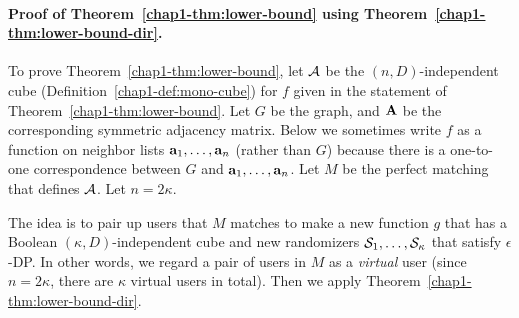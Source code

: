 {\paragraph{Proof of Theorem~\ref{chap1-thm:lower-bound} using Theorem~\ref{chap1-thm:lower-bound-dir}.}
To prove Theorem~\ref{chap1-thm:lower-bound}, let $\mathcal{A}$ be the $(n,D)$-independent 
cube (Definition~\ref{chap1-def:mono-cube}) for $f$ given in the statement of
Theorem~\ref{chap1-thm:lower-bound}. Let $G$ be the graph, 
and 
$\mathbf{A}$ be the corresponding symmetric adjacency matrix. 
Below we sometimes write $f$ as a function on neighbor lists $\mathbf{a}_1, \ldots, \mathbf{a}_n$ (rather than $G$) because there is a one-to-one correspondence between $G$ and $\mathbf{a}_1, \ldots, \mathbf{a}_n$.
Let $M$ be the perfect
matching that defines $\mathcal{A}$. Let $n=2\kappa$.

The idea is to pair up users that $M$ matches to make a new function $g$ that has a Boolean $(\kappa,D)$-independent cube and new randomizers $\mathcal{S}_1, \ldots, \mathcal{S}_\kappa$ that
satisfy $\epsilon$-DP. 
In other words, we regard a pair of users in $M$ as a \textit{virtual} user (since $n=2\kappa$, there are $\kappa$ virtual users in total). 
Then we apply Theorem~\ref{chap1-thm:lower-bound-dir}. 

}
